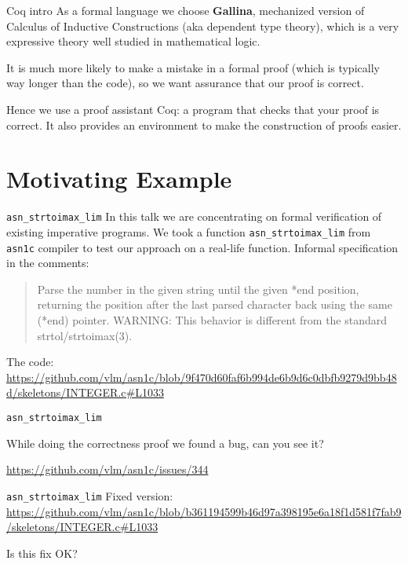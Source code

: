 \documentclass[10pt]{beamer}
\begin{document}
\begin{frame}{Coq intro}
  As a formal language we choose {\bf Gallina}, mechanized version of Calculus of Inductive Constructions (aka dependent type theory), which is a very expressive theory well studied in mathematical logic.


  \smallskip
  
  It is much more likely to make a mistake in a formal proof (which is typically way longer than the code), so we want assurance that our proof is correct.
  \smallskip
  
  Hence we use a proof assistant Coq: a program that checks that your proof is correct. It also provides an environment to make the construction of proofs easier. 
  
  
\end{frame}


\section{Motivating Example}
\begin{frame}{\texttt{asn\_strtoimax\_lim}}
In this talk we are concentrating on formal verification of existing imperative programs. We took a function \texttt{asn\_strtoimax\_lim} from \texttt{asn1c} compiler to test our approach on a real-life function. Informal specification in the comments: 

 \begin{quote}
 Parse the number in the given string until the given *end position,
 returning the position after the last parsed character back using the
 same (*end) pointer.
 WARNING: This behavior is different from the standard strtol/strtoimax(3).
\end{quote}

The code:
 \url{https://github.com/vlm/asn1c/blob/9f470d60faf6b994de6b9d6c0dbfb9279d9bb48d/skeletons/INTEGER.c#L1033}
\end{frame}

\begin{frame}{\texttt{asn\_strtoimax\_lim}}


While doing the correctness proof we found a bug, can you see it?

  \url{https://github.com/vlm/asn1c/issues/344}
  
\end{frame}



\begin{frame}{\texttt{asn\_strtoimax\_lim}}
  Fixed version: \url{https://github.com/vlm/asn1c/blob/b361194599b46d97a398195e6a18f1d581f7fab9/skeletons/INTEGER.c#L1033}

  Is this fix OK?
  
\end{frame}
\end{document}
